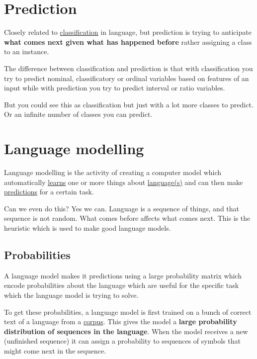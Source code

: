 \documentclass[
  11pt,
  british,
]{article}
\begin{document}
\hypertarget{prediction}{%
\section{Prediction}\label{prediction}}

Closely related to
\href{../Classification/Classification.md}{classification} in language,
but prediction is trying to anticipate \textbf{what comes next given
what has happened before} rather assigning a class to an instance.

The difference between classification and prediction is that with
classification you try to predict nominal, classificatory or ordinal
variables based on features of an input while with prediction you try to
predict interval or ratio variables.

But you could see this as classification but just with a lot more
classes to predict. Or an infinite number of classes you can predict.

\hypertarget{language-modelling}{%
\section{Language modelling}\label{language-modelling}}

Language modelling is the activity of creating a computer model which
automatically \href{../Other/Learning.md}{learns} one or more things
about \href{../Languages/Languages.md}{language(s)} and can then make
\href{Prediction.md}{predictions} for a certain task.

Can we even do this? Yes we can. Language is a sequence of things, and
that sequence is not random. What comes before affects what comes next.
This is the heuristic which is used to make good language models.

\hypertarget{probabilities}{%
\subsection{Probabilities}\label{probabilities}}

A language model makes it predictions using a large probability matrix
which encode probabilities about the language which are useful for the
specific task which the language model is trying to solve.

To get these probabilities, a language model is first trained on a bunch
of correct text of a language from a \href{../Data/Corpus.md}{corpus}.
This gives the model a \textbf{large probability distribution of
sequences in the language}. When the model receives a new (unfinished
sequence) it can assign a probability to sequences of symbols that might
come next in the sequence.
\end{document}
